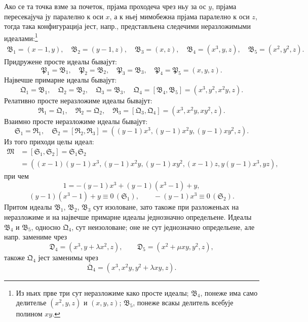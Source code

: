﻿\documentclass[11pt]{article}
\newcommand{\ideal}[1]{\mathfrak{#1}}
\newcommand{\eqzero}[1]{\equiv 0\,(#1)}
\begin{document}
Ако се та точка взме за почеток, прјама проходеча чрез ньу за ос \(y\), прјама пересекајуча ју паралелно к оси \(x\), а к ньеј мимобежна прјама паралелно к оси \(z\), тогда така конфигурација јест, напр., представльена следечими неразложимыми идеалами:\footnote{Из ньих прве три сут неразложиме како просте идеалы; \(\ideal B_4\), понеже има само делителье \((x^2,y,z)\) и \((x,y,z)\); \(\ideal B_5\), понеже всакы делитель всебује полином \(xy\).}
\[
\begin{gathered}
 \ideal B_1=(x-1,y),\quad
 \ideal B_2=(y-1,z),\quad
 \ideal B_3=(x,z),\quad
 \ideal B_4=(x^3,y,z),\quad
 \ideal B_5=(x^2,y^2,z).
\end{gathered}
\]
Придружене просте идеалы бывајут:
\[
 \ideal P_1=\ideal B_1,
 \quad \ideal P_2=\ideal B_2,
 \quad \ideal P_3=\ideal B_3,
 \quad \ideal P_4=\ideal P_5=(x,y,z).
\]
Највечше примарне идеалы бывајут:
\[
 \ideal Q_1=\ideal B_1,
 \quad \ideal Q_2=\ideal B_2,
 \quad \ideal Q_3=\ideal B_3,
 \quad \ideal Q_4=[\ideal B_4,\ideal B_5]=(x^3,y^2,x^2y,z).
\]
Релативно просте неразложиме идеалы бывајут:
\[
 \ideal R_1=\ideal Q_1,
 \quad \ideal R_2=\ideal Q_2,
 \quad \ideal R_3=[\ideal Q_3,\ideal Q_4]=(x^3,x^2y,xy^2,z).
\]
Взаимно просте неразложиме идеалы бывајут:
\[
 \ideal S_1=\ideal R_1,
 \quad
 \ideal S_2=[\ideal R_2,\ideal R_3]=((y-1)x^3,(y-1)x^2y,(y-1)xy^2,z).
\]
Из того приходи целы идеал:
\[
\begin{aligned}
 \ideal M&=[\ideal S_1,\ideal S_2]=\ideal S_1\ideal S_2 \\
 &=((x-1)(y-1)x^3,(y-1)x^2y,(y-1)xy^2,(x-1)z,y(y-1)x^3,yz),
\end{aligned}
\]
при чем
\[
 1=-(y-1)x^3+(y-1)(x^3-1)+y,
\]
\[
 (y-1)(x^3-1)+y\eqzero{\ideal S_1},
 \qquad -(y-1)x^3\eqzero{\ideal S_2}.
\]
Притом идеалы \(\ideal B_1\), \(\ideal B_2\), \(\ideal B_3\) сут изоловане, зато такоже при разложеньах на неразложиме и на највечше примарне идеалы једнозначно определьене. Идеалы \(\ideal B_4\) и \(\ideal B_5\), односно \(\ideal Q_4\), сут неизоловане; оне не сут једнозначно определьене, але напр. замениме чрез
\[
 \ideal D_4=(x^3,y+\lambda x^2,z),
 \qquad
 \ideal D_5=(x^2+\mu xy,y^2,z),
\]
такоже \(\ideal Q_4\) јест заменимы чрез
\[
 \overline{\ideal Q}_4=(x^3,x^2y,y^2+\lambda xy,z).
\]
\end{document}
